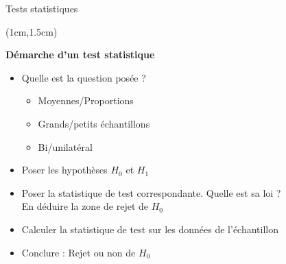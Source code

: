 \documentclass{beamer}
\begin{document}
\begin{frame}{Tests statistiques}
\begin{textblock*}{\textwidth}(1cm,1.5cm)
\begin{center}{\bf \Large Démarche d'un test statistique} \end{center}
\vspace{0.2cm}
\begin{itemize}
\item Quelle est la question posée ? \\
\begin{itemize}
\item Moyennes/Proportions 
\item Grands/petits échantillons  
\item Bi/unilatéral
\end{itemize}
\vspace{0.1cm}
\item Poser les hypothèses $H_0$ et $H_1$ 
\vspace{0.1cm}
\item Poser la statistique de test correspondante. Quelle est sa loi ? \\
En déduire la zone de rejet de $H_0$ 
\vspace{0.1cm}
\item Calculer la statistique de test sur les données de l'échantillon
\vspace{0.1cm}
\item Conclure : Rejet ou non de $H_0$
\end{itemize}

\end{textblock*}

\end{frame}

\end{document}
